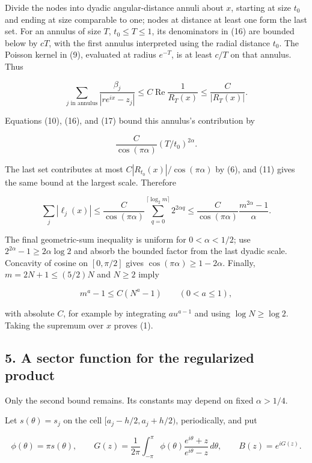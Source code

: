 \documentclass[10pt,a4paper]{article}
\begin{document}
Divide the nodes into dyadic angular-distance annuli about \(x\),
starting at size \(t_0\) and ending at size comparable to one; nodes at
distance at least one form the last set. For an annulus of size \(T\),
\(t_0\le T\le1\), its denominators in (16) are bounded below by \(cT\),
with the first annulus interpreted using the radial distance \(t_0\).
The Poisson kernel in (9), evaluated at radius \(e^{-T}\), is at least
\(c/T\) on that annulus. Thus

\nopagebreak[4]
\[\sum_{j\text{ in annulus}}\frac{\beta_j}{|re^{ix}-z_j|}
 \le C\operatorname{Re}\frac1{R_T(x)}
 \le \frac C{|R_T(x)|}. \tag{17}\]

Equations (10), (16), and (17) bound this annulus's contribution by

\nopagebreak[4]
\[\frac{C}{\cos(\pi\alpha)}(T/t_0)^{2\alpha}. \tag{18}\]

The last set contributes at most \(C|R_{t_0}(x)|/\cos(\pi\alpha)\) by
(6), and (11) gives the same bound at the largest scale. Therefore

\nopagebreak[4]
\[\sum_j|\ell_j(x)|\le
 \frac C{\cos(\pi\alpha)}\sum_{q=0}^{\lceil\log_2m\rceil}2^{2\alpha q}
 \le \frac C{\cos(\pi\alpha)}\frac{m^{2\alpha}-1}{\alpha}. \tag{19}\]

The final geometric-sum inequality is uniform for \(0<\alpha<1/2\); use
\(2^{2\alpha}-1\ge2\alpha\log2\) and absorb the bounded factor from the
last dyadic scale. Concavity of cosine on \([0,\pi/2]\) gives
\(\cos(\pi\alpha)\ge1-2\alpha\). Finally, \(m=2N+1\le(5/2)N\) and
\(N\ge2\) imply

\nopagebreak[4]
\[m^a-1\le C(N^a-1)\qquad(0<a\le1),\]

with absolute \(C\), for example by integrating \(a u^{a-1}\) and using
\(\log N\ge\log2\). Taking the supremum over \(x\) proves (1).

\subsection{5. A sector function for the regularized
product}\label{a-sector-function-for-the-regularized-product}

Only the second bound remains. Its constants may depend on fixed
\(\alpha>1/4\).

Let \(s(\theta)=s_j\) on the cell \([a_j-h/2,a_j+h/2)\), periodically,
and put

\nopagebreak[4]
\[\phi(\theta)=\pi s(\theta),\qquad
 G(z)=\frac1{2\pi}\int_{-\pi}^{\pi}
       \phi(\theta)\frac{e^{i\theta}+z}{e^{i\theta}-z}\,d\theta,
 \qquad B(z)=e^{iG(z)}. \tag{20}\]
\end{document}
